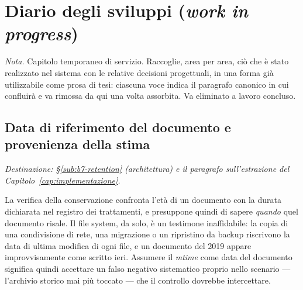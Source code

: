 
\chapter{Diario degli sviluppi (\emph{work in progress})}
\label{cap:diario-sviluppi}

\textit{Nota.} Capitolo temporaneo di servizio. Raccoglie, area per area, ciò che è stato realizzato nel sistema con le relative decisioni progettuali, in una forma già utilizzabile come prosa di tesi: ciascuna voce indica il paragrafo canonico in cui confluirà e va rimossa da qui una volta assorbita. Va eliminato a lavoro concluso.

\section{Data di riferimento del documento e provenienza della stima}
\label{sec:sv-reference-date}

\textit{Destinazione: §\ref{sub:b7-retention} (architettura) e il paragrafo sull'estrazione del Capitolo~\ref{cap:implementazione}.} \medskip

La verifica della conservazione confronta l'età di un documento con la durata dichiarata nel registro dei trattamenti, e presuppone quindi di sapere \emph{quando} quel documento risale. Il file system, da solo, è un testimone inaffidabile: la copia di una condivisione di rete, una migrazione o un ripristino da backup riscrivono la data di ultima modifica di ogni file, e un documento del 2019 appare improvvisamente come scritto ieri. Assumere il \emph{mtime} come data del documento significa quindi accettare un falso negativo sistematico proprio nello scenario --- l'archivio storico mai più toccato --- che il controllo dovrebbe intercettare. \medskip


